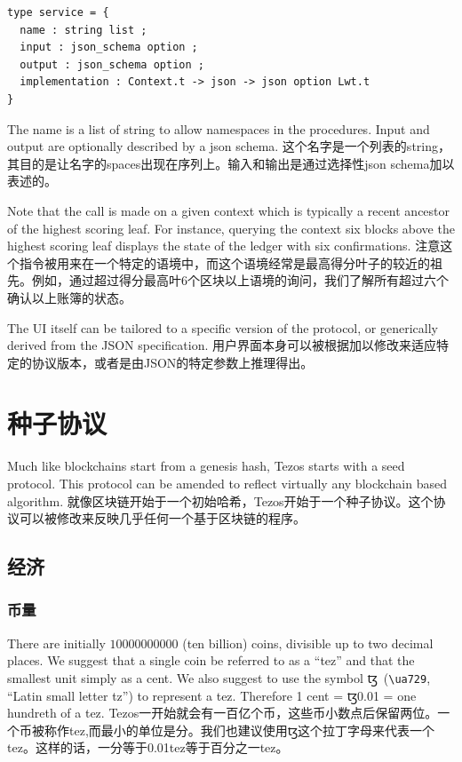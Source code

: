 \documentclass[letterpaper]{article}
\newcommand{\tz}{{\fontspec{DejaVu Sans} \small{ꜩ}}}
\begin{document}
\begin{lstlisting}
type service = {
  name : string list ;
  input : json_schema option ;
  output : json_schema option ;
  implementation : Context.t -> json -> json option Lwt.t
}
\end{lstlisting}

The name is a list of string to allow namespaces in the procedures. Input and
output are optionally described by a json schema.
这个名字是一个列表的string，其目的是让名字的spaces出现在序列上。输入和输出是通过选择性json schema加以表述的。

Note that the call is made on a given context which is typically a recent ancestor
of the highest scoring leaf. For instance, querying the context six blocks above
the highest scoring leaf displays the state of the ledger with six confirmations.
注意这个指令被用来在一个特定的语境中，而这个语境经常是最高得分叶子的较近的祖先。例如，通过超过得分最高叶6个区块以上语境的询问，我们了解所有超过六个确认以上账簿的状态。

The UI itself can be tailored to a specific version of the protocol, or generically
derived from the JSON specification.
用户界面本身可以被根据加以修改来适应特定的协议版本，或者是由JSON的特定参数上推理得出。

\section{种子协议}
Much like blockchains start from a genesis hash, Tezos starts with a seed
protocol. This protocol can be amended to reflect virtually any blockchain based
algorithm.
就像区块链开始于一个初始哈希，Tezos开始于一个种子协议。这个协议可以被修改来反映几乎任何一个基于区块链的程序。

\subsection{经济}

\subsubsection{币量}
There are initially $\num{10000000000}$ (ten billion) coins, divisible up to two
decimal places. We suggest that a single coin be referred to as a ``tez''
and that the smallest unit simply as a cent. We also suggest to use the
symbol \tz~(\verb!\ua729!, ``Latin small letter tz'') to represent a tez.
Therefore 1 cent = \tz\num{0.01} = one hundreth of a tez.
Tezos一开始就会有一百亿个币，这些币小数点后保留两位。一个币被称作tez,而最小的单位是分。我们也建议使用ꜩ这个拉丁字母来代表一个tez。这样的话，一分等于0.01tez等于百分之一tez。
\end{document}
